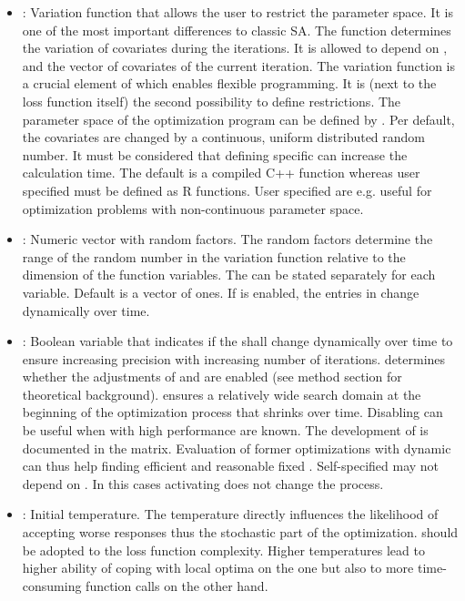     \begin{itemize}
\item {}:  Variation function that allows the user to restrict the parameter space. It is one of the most important differences to classic SA. The function determines the variation of covariates during the iterations. It is allowed to depend on ,  and the vector of covariates of the current iteration. The variation function is a crucial element of  which enables flexible programming. It is (next to the loss function itself) the second possibility to define restrictions. The parameter space of the optimization program can be defined by . Per default, the covariates are changed by a continuous, uniform distributed random number. It must be considered that defining specific  can increase the calculation time. The default  is a compiled C++ function whereas user specified  must be defined as R functions. User specified are e.g. useful for optimization problems with non-continuous parameter space.
\item {}: Numeric vector with random factors. The random factors determine the range of the random number in the variation function  relative to the dimension of the function variables. The  can be stated separately for each variable. Default is a vector of ones. If  is enabled, the entries in  change dynamically over time.
\item {}: Boolean variable that indicates if the  shall change dynamically over time to ensure increasing precision with increasing number of iterations.  determines whether the adjustments of \citet{corana_1987} and \citet{pronzato_1984} are enabled (see method section for theoretical background).  ensures a relatively wide search domain at the beginning of the optimization process that shrinks over time. Disabling  can be useful when  with high performance are known. The development of  is documented in the  matrix. Evaluation of former optimizations with dynamic  can thus help finding efficient and reasonable fixed . Self-specified  may not depend on . In this cases activating  does not change the process.
\item {}: Initial temperature. The temperature directly influences the likelihood of accepting worse responses thus the stochastic part of the optimization.  should be adopted to the loss function complexity. Higher temperatures lead to higher ability of coping with local optima on the one but also to more time-consuming function calls on the other hand.

\end{itemize}
